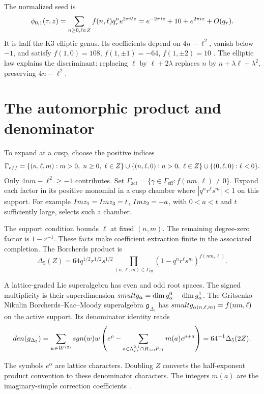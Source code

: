 The normalized seed is
\[
 \phi_{0,1}(\tau,z)=\sum_{n\geq0,\ell\in Z}f(n,\ell)
 q_\tau^n e^{2\pi i\ell z}=e^{-2\pi iz}+10+e^{2\pi iz}+O(q_\tau).
\]
It is half the K3 elliptic genus. Its coefficients depend on
\(4n-\ell^2\), vanish below \(-1\), and satisfy
\(f(1,0)=108\), \(f(1,\pm1)=-64\), \(f(1,\pm2)=10\)
\cite{EZ:1,DMVV}. The elliptic law explains the discriminant:
replacing \(\ell\) by \(\ell+2\lambda\) replaces \(n\) by
\(n+\lambda\ell+\lambda^2\), preserving \(4n-\ell^2\).

\section{The automorphic product and denominator}
\label{sec:edge-1-2}

To expand at a cusp, choose the positive indices
\[
 \Gamma_{eff}=
 \{(n,\ell,m):m>0,\ n\geq0,\ \ell\in Z\}
 \cup\{(n,\ell,0):n>0,\ \ell\in Z\}
 \cup\{(0,\ell,0):\ell<0\}.
\]
Only \(4nm-\ell^2\geq-1\) contributes. Set
\(\Gamma_{\mathrm{act}}=\{\gamma\in\Gamma_{\mathrm{eff}}:
 f(nm,\ell)\ne0\}\). Expand each factor in its positive monomial
in a cusp chamber where \(|q^nr^\ell s^m|<1\) on this support.
For example \(Im z_1=Im z_3=t\), \(Im z_2=-a\),
with \(0<a<t\) and \(t\) sufficiently large, selects such a
chamber.

The support condition bounds \(\ell\) at fixed \((n,m)\).
The remaining degree-zero factor is \(1-r^{-1}\). These facts
make coefficient extraction finite in the associated completion.
The Borcherds product is
\[
 \Delta_5(Z)=64q^{1/2}r^{1/2}s^{1/2}
 \prod_{(n,\ell,m)\in\Gamma_{\mathrm{eff}}}
 (1-q^nr^\ell s^m)^{f(nm,\ell)}.
\]

A lattice-graded Lie superalgebra has even and odd root spaces.
The signed multiplicity is their superdimension
\(smultg_\alpha=\dim g_\alpha^{0}
-\dim g_\alpha^{1}\).
The Gritsenko--Nikulin Borcherds--Kac--Moody superalgebra
\(\mathfrak g_{\Delta_5}\) has
\(smultg_{\alpha(n,\ell,m)}=f(nm,\ell)\)
on the active support. Its denominator identity reads
\[
 den(g_{\Delta_5})
 =\sum_{w\in W^{(2)}}sgn(w)w\left(e^\rho-
 \sum_{a\in\Lambda^{2,1}_{II}\cap R_{>0}P_{II}}
 m(a)e^{\rho+a}\right)
 =64^{-1}\Delta_5(2Z).
\]

The symbols \(e^\alpha\) are lattice characters. Doubling \(Z\)
converts the half-exponent product convention to these denominator
characters. The integers \(m(a)\) are the imaginary-simple
correction coefficients \cite[Theorem 2.3(a)]{GN}.


